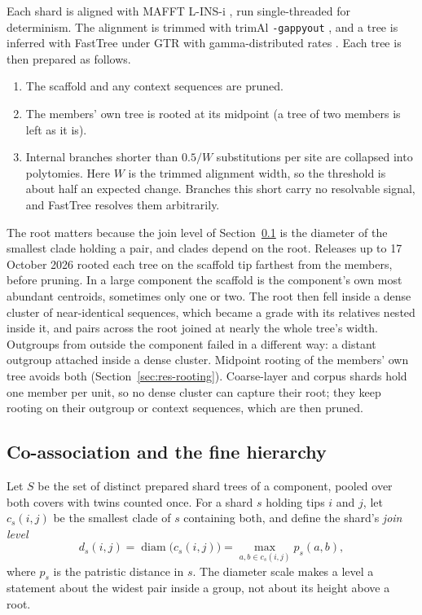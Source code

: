 \documentclass[11pt,a4paper]{article}
\begin{document}
Each shard is aligned with MAFFT L-INS-i \citep{katoh2005mafft5,katoh2013mafft}, run
single-threaded for determinism. The alignment is trimmed with trimAl \texttt{-gappyout}
\citep{capella2009trimal}, and a tree is inferred with FastTree under GTR with gamma-distributed
rates \citep{price2010fasttree}. Each tree is then prepared as follows.
\begin{enumerate}
  \item The scaffold and any context sequences are pruned.
  \item The members' own tree is rooted at its midpoint (a tree of two members is left as it is).
  \item Internal branches shorter than $0.5/W$ substitutions per site are collapsed into
        polytomies. Here $W$ is the trimmed alignment width, so the threshold is about half an
        expected change. Branches this short carry no resolvable signal, and FastTree resolves
        them arbitrarily.
\end{enumerate}
The root matters because the join level of Section~\ref{sec:coassoc} is the diameter of the
smallest clade holding a pair, and clades depend on the root. Releases up to 17 October 2026
rooted each tree on the scaffold tip farthest from the members, before pruning. In a large
component the scaffold is the component's own most abundant centroids, sometimes only one or two.
The root then fell inside a dense cluster of near-identical sequences, which became a grade with
its relatives nested inside it, and pairs across the root joined at nearly the whole tree's width.
Outgroups from outside the component failed in a different way: a distant outgroup attached inside
a dense cluster. Midpoint rooting of the members' own tree avoids both
(Section~\ref{sec:res-rooting}). Coarse-layer and corpus shards hold one member per unit, so no
dense cluster can capture their root; they keep rooting on their outgroup or context sequences,
which are then pruned.

\subsection{Co-association and the fine hierarchy}\label{sec:coassoc}

Let $S$ be the set of distinct prepared shard trees of a component, pooled over both covers with
twins counted once. For a shard $s$ holding tips $i$ and $j$, let $c_s(i,j)$ be the smallest clade
of $s$ containing both, and define the shard's \emph{join level}
\begin{equation}
  d_s(i,j) = \operatorname{diam}\bigl(c_s(i,j)\bigr) = \max_{a,b \in c_s(i,j)} p_s(a,b),
\end{equation}
where $p_s$ is the patristic distance in $s$. The diameter scale makes a level a statement about
the widest pair inside a group, not about its height above a root.
\end{document}
